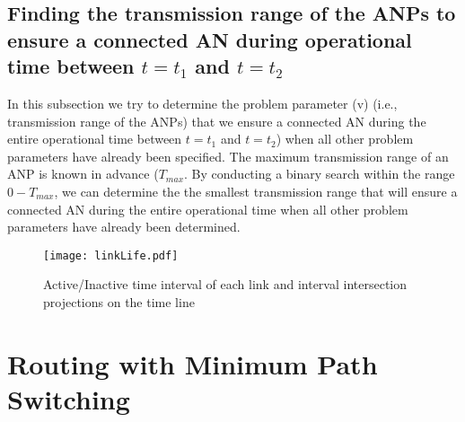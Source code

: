 \documentclass[10pt]{IEEEtran}
\begin{document}
\subsection {Finding the transmission range of the ANPs to ensure a connected AN during operational time between $t = t_1$ and $t = t_2$}

In this subsection we try to determine the problem parameter (v) (i.e., transmission range of the ANPs) that we ensure a connected AN during the entire operational time between $t = t_1$ and $t = t_2$) when all other problem parameters have already been specified. The maximum transmission range of an ANP is known in advance ($T_{max}$. By conducting a binary search within the range $0 - T_{max}$, we can determine the the smallest transmission range that will ensure a connected AN during the entire operational time when all other problem parameters have already been determined.

\begin{figure}[!t]
\centering
\texttt{[image: linkLife.pdf]}
\caption{Active/Inactive time interval of each link and interval intersection projections on the time line}
\label{fig:interval}
\end{figure}

\section{Routing with Minimum Path Switching}
\label{sec:routing}
\end{document}
